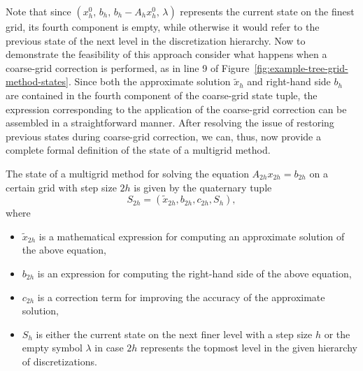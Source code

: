 Note that since $(x_{h}^0, \, b_h, \, b_{h} - A_h x_{h}^0, \, \lambda)$ represents the current state on the finest grid, its fourth component is empty, while otherwise it would refer to the previous state of the next level in the discretization hierarchy.
Now to demonstrate the feasibility of this approach consider what happens when a coarse-grid correction is performed, as in line 9 of Figure~\ref{fig:example-tree-grid-method-states}.
Since both the approximate solution $\tilde{x}_h$ and right-hand side $b_h$ are contained in the fourth component of the coarse-grid state tuple, the expression corresponding to the application of the coarse-grid correction can be assembled in a straightforward manner.
After resolving the issue of restoring previous states during coarse-grid correction, we can, thus, now provide a complete formal definition of the state of a multigrid method.
\begin{definition}
The state of a multigrid method for solving the equation $A_{2h} x_{2h} = b_{2h}$ on a certain grid with step size $2h$ is given by the quaternary tuple
\begin{equation*}
	S_{2h} = \left( \tilde{x}_{2h}, b_{2h}, c_{2h}, S_{h}\right), 
\end{equation*}
where
\begin{itemize}
	\item $\tilde{x}_{2h}$ is a mathematical expression for computing an approximate solution of the above equation,
	\item $b_{2h}$ is an expression for computing the right-hand side of the above equation,
	\item $c_{2h}$ is a correction term for improving the accuracy of the approximate solution,
	\item $S_{h}$ is either the current state on the next finer level with a step size $h$ or the empty symbol $\lambda$ in case $2h$ represents the topmost level in the given hierarchy of discretizations. 
\end{itemize}
\end{definition}
 


